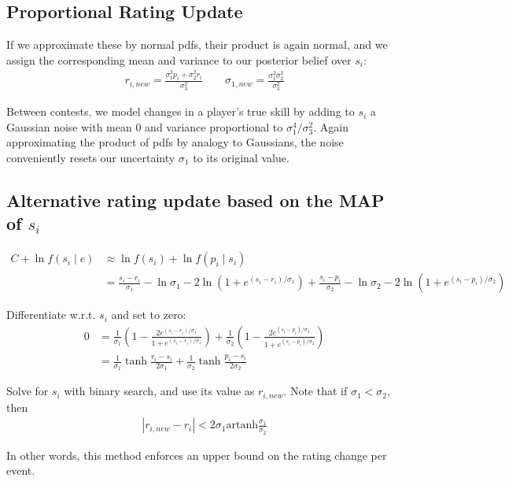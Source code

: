 \documentclass{article}
\begin{document}
\subsection{Proportional Rating Update}

If we approximate these by normal pdfs, their product is again normal, and we assign the corresponding mean and variance to our posterior belief over $s_i$:
\begin{align}
r_{i,new} = \frac{\sigma_1^2p_i + \sigma_2^2r_i}{\sigma_3^2} \qquad \sigma_{1,new} = \frac{\sigma_1^2\sigma_2^2}{\sigma_3^2}
\end{align}

Between contests, we model changes in a player's true skill by adding to $s_i$ a Gaussian noise with mean $0$ and variance proportional to $\sigma_1^4 / \sigma_3^2$. Again approximating the product of pdfs by analogy to Gaussians, the noise conveniently resets our uncertainty $\sigma_1$ to its original value.

\subsection{Alternative rating update based on the MAP of $s_i$}

\begin{align}
C + \ln f(s_i \mid e) &\approx \ln f(s_i) + \ln f(p_i\mid s_i)
\\&= \frac{s_i-r_i}{\sigma_1} - \ln \sigma_1 - 2\ln\left(1 + e^{(s_i-r_i)/\sigma_1} \right)
	+\frac{s_i-p_i}{\sigma_2} - \ln \sigma_2 - 2\ln\left(1 + e^{(s_i-p_i)/\sigma_2} \right)
\end{align}

Differentiate w.r.t. $s_i$ and set to zero:
\begin{align}
0 &= \frac{1}{\sigma_1}\left( 1 - \frac {2e^{(s_i-r_i)/\sigma_1}} {1 + e^{(s_i-r_i)/\sigma_1}} \right)
	+ \frac{1}{\sigma_2}\left( 1 - \frac {2e^{(s_i-p_i)/\sigma_2}} {1 + e^{(s_i-p_i)/\sigma_2}} \right)
\\ &= \frac{1}{\sigma_1} \tanh \frac {r_i-s_i} {2\sigma_1}
	+ \frac{1}{\sigma_2} \tanh \frac {p_i-s_i} {2\sigma_2}
\end{align}

Solve for $s_i$ with binary search, and use its value as $r_{i,new}$. Note that if $\sigma_1 < \sigma_2$, then
\begin{align}
|r_{i,new} - r_i| < 2\sigma_1 \text{artanh}\frac{\sigma_1}{\sigma_2}
\end{align}

In other words, this method enforces an upper bound on the rating change per event.
\end{document}
